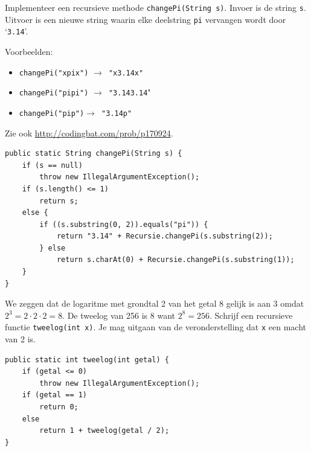 \begin{oef}
\code Implementeer een recursieve methode \verb/changePi(String s)/. Invoer is de string \verb/s/. Uitvoer is een nieuwe string waarin elke deelstring \verb/pi/ vervangen wordt door `\verb/3.14/'. 

Voorbeelden:
\begin{itemize}
\item \verb/changePi("xpix")/ $\rightarrow $\verb/ "x3.14x"/
\item \verb/changePi("pipi")/ $\rightarrow $\verb/ "3.143.14/"
\item \verb/changePi("pip")/$ \rightarrow $\verb/ "3.14p"/
\end{itemize}
Zie ook \url{http://codingbat.com/prob/p170924}.
\begin{opl}
\begin{lstlisting}[caption={Vervang in een string elke pi door een 3.14}, label=recchangepi]
public static String changePi(String s) {
	if (s == null)
		throw new IllegalArgumentException();
	if (s.length() <= 1)
		return s;
	else {
		if ((s.substring(0, 2)).equals("pi")) {
			return "3.14" + Recursie.changePi(s.substring(2));
		} else
			return s.charAt(0) + Recursie.changePi(s.substring(1));
	}
}
\end{lstlisting}
\end{opl}

\end{oef}

\begin{oef}
\code We zeggen dat de logaritme met grondtal 2 van het getal 8 gelijk is aan 3 omdat $2^3 = 2\cdot 2 \cdot 2 = 8$. De tweelog van 256 is 8 want $2^8 = 256$. Schrijf een recursieve functie \verb+tweelog(int x)+. Je mag uitgaan van de veronderstelling dat \verb+x+ een macht van 2 is.
\begin{opl}
\begin{lstlisting}[caption={Tweelog van een macht van twee}, label=rectweelog]
public static int tweelog(int getal) {
	if (getal <= 0)
		throw new IllegalArgumentException();
	if (getal == 1)
		return 0;
	else
		return 1 + tweelog(getal / 2);
}
\end{lstlisting}
\end{opl}
\end{oef}



